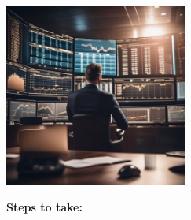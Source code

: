 \documentclass[
  letterpaper,
  DIV=11,
  numbers=noendperiod]{scrreprt}
\begin{document}
\begin{center}
\includegraphics[width=0.45\textwidth,height=\textheight]{images/aitrader.jpg}
\end{center}

\textbf{Steps to take:}
\end{document}
